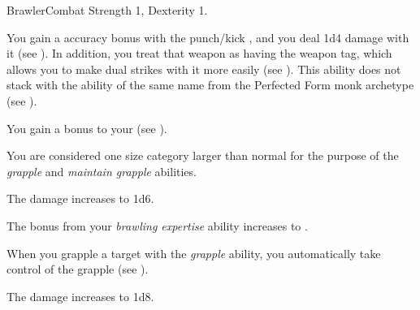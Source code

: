   \begin{feat}{Brawler}{Combat}
    \featpre Strength 1, Dexterity 1.

     You gain a  accuracy bonus with the punch/kick , and you deal 1d4 damage with it (see ).
    In addition, you treat that weapon as having the  weapon tag, which allows you to make dual strikes with it more easily (see ).
    This ability does not stack with the ability of the same name from the Perfected Form monk archetype (see ).

     You gain a  bonus to your  (see ).

     You are considered one size category larger than normal for the purpose of the \textit{grapple} and \textit{maintain grapple} abilities.

     The damage increases to 1d6.

     The bonus from your \textit{brawling expertise} ability increases to .

     When you grapple a target with the \textit{grapple} ability, you automatically take control of the grapple (see ).

     The damage increases to 1d8.
  \end{feat}

